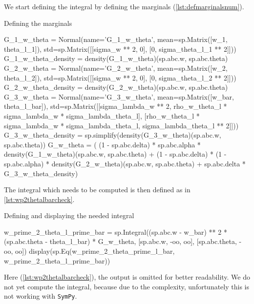 We start defining the integral by defining the marginals (\cref{lst:defmarginalsnum}).
\begin{listing}[!ht]
    \caption{Defining the marginals}
    \label{lst:defmarginalsnum}
    \begin{pythoncode}
        G_1_w_theta = Normal(name='G_1_w_theta', mean=sp.Matrix([w_1, theta_l_1]),
            std=sp.Matrix([[sigma_w ** 2, 0], [0, sigma_theta_l_1 ** 2]]))
        G_1_w_theta_density = density(G_1_w_theta)(sp.abc.w, sp.abc.theta)
        G_2_w_theta = Normal(name='G_2_w_theta', mean=sp.Matrix([w_2, theta_l_2]),
            std=sp.Matrix([[sigma_w ** 2, 0], [0, sigma_theta_l_2 ** 2]]))
        G_2_w_theta_density = density(G_2_w_theta)(sp.abc.w, sp.abc.theta)
        G_3_w_theta = Normal(name='G_3_w_theta', mean=sp.Matrix([w_bar, theta_l_bar]),
            std=sp.Matrix([[sigma_lambda_w ** 2, 
                rho_w_theta_l * sigma_lambda_w * sigma_lambda_theta_l], 
                [rho_w_theta_l * sigma_lambda_w * sigma_lambda_theta_l, 
                sigma_lambda_theta_l ** 2]]))
        G_3_w_theta_density = sp.simplify(density(G_3_w_theta)(sp.abc.w, sp.abc.theta))
        G_w_theta = (
        (1 - sp.abc.delta) * sp.abc.alpha * density(G_1_w_theta)(sp.abc.w, sp.abc.theta) 
        + (1 - sp.abc.delta) * (1 - sp.abc.alpha) * density(G_2_w_theta)(sp.abc.w, sp.abc.theta) 
        + sp.abc.delta * G_3_w_theta_density)
    \end{pythoncode}
\end{listing}

The integral which needs to be computed is then defined as in \cref{lst:wp2thetalbarcheck}.
\begin{listing}[!ht]
    \caption{Defining and displaying the needed integral}
    \label{lst:wp2thetalbarcheck}
    \begin{pythoncode}
        w_prime_2_theta_l_prime_bar = sp.Integral((sp.abc.w - w_bar) ** 2 * 
            (sp.abc.theta - theta_l_bar) * G_w_theta, 
            [sp.abc.w, -oo, oo], [sp.abc.theta, -oo, oo])
        display(sp.Eq(w_prime_2_theta_prime_l_bar, w_prime_2_theta_l_prime_bar))
    \end{pythoncode}
\end{listing}

Here (\cref{lst:wp2thetalbarcheck}), the output is omitted for better readability.
We do not yet compute the integral, 
because due to the complexity, 
unfortunately this is not working with \texttt{SymPy}.

